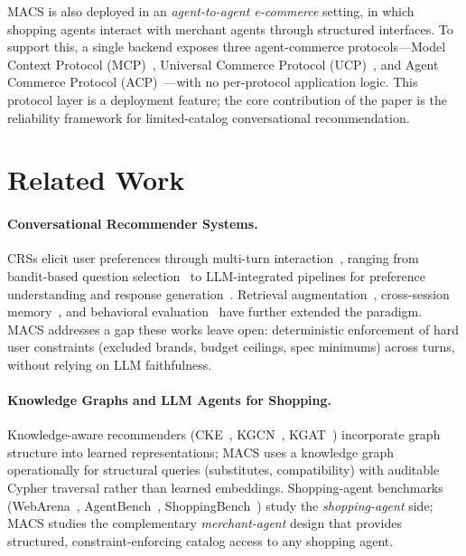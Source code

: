 \documentclass[sigconf,anonymous]{acmart}
\begin{document}
MACS is also deployed in an \emph{agent-to-agent e-commerce} setting, in which
shopping agents interact with merchant agents through structured interfaces.
To support this, a single backend exposes three agent-commerce
protocols---Model Context Protocol (MCP)~\cite{Anthropic2024MCP},
Universal Commerce Protocol (UCP)~\cite{Google2026UCP},
and Agent Commerce Protocol (ACP)~\cite{OpenAI2025ACP}---with no
per-protocol application logic.
This protocol layer is a deployment feature; the core contribution of the paper
is the reliability framework for limited-catalog conversational recommendation.

\section{Related Work}

\paragraph{Conversational Recommender Systems.}
CRSs elicit user preferences through multi-turn interaction~\cite{Jannach2021Survey},
ranging from bandit-based question selection~\cite{Christakopoulou2016,Sun2018}
to LLM-integrated pipelines for preference understanding and response
generation~\cite{Friedman2023,Feng2023LLMCRS,Liu2023CRSLLM}.
Retrieval augmentation~\cite{Yang2024ReFICR}, cross-session
memory~\cite{Xi2024MemoCRS}, and behavioral evaluation~\cite{Yang2024BehaviorAlignment}
have further extended the paradigm.
MACS addresses a gap these works leave open: deterministic enforcement of
hard user constraints (excluded brands, budget ceilings, spec minimums)
across turns, without relying on LLM faithfulness.

\paragraph{Knowledge Graphs and LLM Agents for Shopping.}
Knowledge-aware recommenders (CKE~\cite{Zhang2016CKE}, KGCN~\cite{Wang2019KGCN},
KGAT~\cite{Wang2019KGAT}) incorporate graph structure into learned representations;
MACS uses a knowledge graph operationally for structural queries (substitutes,
compatibility) with auditable Cypher traversal rather than learned embeddings.
Shopping-agent benchmarks (WebArena~\cite{Zhou2023WebArena},
AgentBench~\cite{Liu2023AgentBench}, ShoppingBench~\cite{Wang2025ShoppingBench})
study the \emph{shopping-agent} side; MACS studies the complementary
\emph{merchant-agent} design that provides structured, constraint-enforcing
catalog access to any shopping agent.
\end{document}
